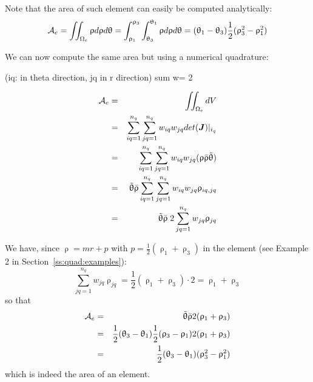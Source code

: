 \vspace{1cm}

Note that the area of such element can easily be computed analytically:
\[
{\cal A}_e 
= \iint_{\Omega_e} \uprho d\uprho d\uptheta 
= \int_{\uprho_1}^{\uprho_3}\int_{\uptheta_3}^{\uptheta_1} \uprho d\uprho d\uptheta 
= (\uptheta_1-\uptheta_3) \frac12 (\uprho_3^2-\uprho_1^2)
\]


We can now compute the same area but using a numerical quadrature:


(iq: in theta direction, jq in r direction) sum w= 2 

\begin{eqnarray}
{\cal A}_e
&=&\iint_{\Omega_e} dV  \nonumber\\
&=&\sum_{iq=1}^{n_q} \sum_{jq=1}^{n_q}   w_{iq} w_{jq} det({\bm J})|_{i_q} \nonumber\\
&=&\sum_{iq=1}^{n_q} \sum_{jq=1}^{n_q}   w_{iq} w_{jq} ( \uprho \bar{\uprho} \tilde{\uptheta} ) \nonumber\\
&=& \tilde{\uptheta} \bar{\uprho}  \sum_{iq=1}^{n_q} \sum_{jq=1}^{n_q}   w_{iq} w_{jq} \uprho_{iq,jq} \nonumber\\
&=& \tilde{\uptheta}   \bar{\uprho} \;  2  \sum_{jq=1}^{n_q}  w_{jq} \uprho_{jq} 
\end{eqnarray}

We have, since $\uprho = mr+p $ with $p=\frac12 (\uprho_1+\uprho_3)$ in the element (see Example 2 in Section~\ref{ss:quad:examples}):
\[ 
\sum_{jq=1}^{n_q}  w_{jq} \uprho_{jq} = \frac12 (\uprho_1+\uprho_3)  \cdot 2 = \uprho_1+\uprho_3
\]
so that
\begin{eqnarray}
{\cal A}_e
&=&\tilde{\uptheta}   \bar{\uprho}   2 (\uprho_1+\uprho_3) \nonumber\\
&=&\frac12 (\uptheta_3-\uptheta_1)  \frac12 (\uprho_3-\uprho_1)  2 (\uprho_1+\uprho_3) \nonumber\\
&=&\frac12 (\uptheta_3-\uptheta_1)   (\uprho_3^2-\uprho_1^2) 
\end{eqnarray}
which is indeed the area of an element.













\vspace{.5cm}

